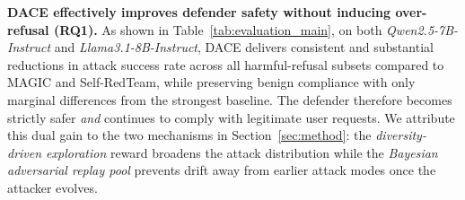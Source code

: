 \documentclass{article}
\newcommand{\method}{\textsc{DACE}\xspace}
\begin{document}
\textbf{\method effectively improves defender safety without inducing over-refusal (RQ1).} As shown in Table~\ref{tab:evaluation_main}, on both \textit{Qwen2.5-7B-Instruct} and \textit{Llama3.1-8B-Instruct}, \method delivers consistent and substantial reductions in attack success rate across all harmful-refusal subsets compared to MAGIC and Self-RedTeam, while preserving benign compliance with only marginal differences from the strongest baseline. The defender therefore becomes strictly safer \emph{and} continues to comply with legitimate user requests. We attribute this dual gain to the two mechanisms in Section~\ref{sec:method}: the \emph{diversity-driven exploration} reward broadens the attack distribution while the \emph{Bayesian adversarial replay pool} prevents drift away from earlier attack modes once the attacker evolves.
\end{document}
